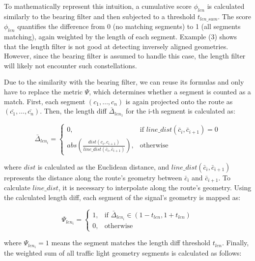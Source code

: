 To mathematically represent this intuition, a cumulative score $\phi_{len}$ is calculated similarly to the bearing filter and then subjected to a threshold $t_{len\_sum}$. The score $\phi_{len}$ quantifies the difference from 0 (no matching segments) to 1 (all segments matching), again weighted by the length of each segment. Example (3) shows that the length filter is not good at detecting inversely aligned geometries. However, since the bearing filter is assumed to handle this case, the length filter will likely not encounter such constellations.

Due to the similarity with the bearing filter, we can reuse its formulas and only have to replace the metric $\Psi$, which determines whether a segment is counted as a match. First, each segment $(c_1, \dots, c_n)$ is again projected onto the route as $(\bar{c_1}, \dots, \bar{c_n})$. Then, the length diff $\bar{\Delta}_{len_1}$ for the i-th segment is calculated as:

\begin{equation}
    \bar{\Delta}_{len_i} = 
        \begin{cases}
            0,& \text{if } line\_dist(\bar{c}_i, \bar{c}_{i+1}) = 0 \\
            abs(\frac{dist(c_{i}, c_{i+1})}{line\_dist(\bar{c}_{i}, \bar{c}_{i+1})}),              & \text{otherwise}
        \end{cases}
\end{equation}

where $dist$ is calculated as the Euclidean distance, and $line\_dist(\bar{c}_i, \bar{c}_{i+1})$ represents the distance along the route's geometry between $\bar{c}_i$ and $\bar{c}_{i+1}$. To calculate $line\_dist$, it is necessary to interpolate along the route's geometry. Using the calculated length diff, each segment of the signal's geometry is mapped as:

\begin{equation}
\Psi_{len_i} = 
    \begin{cases}
            1,& \text{if } \bar{\Delta}_{len_{i}} \in \left(1 - t_{len}, 1 + t_{len}\right)\\
            0,              & \text{otherwise}
        \end{cases}
\end{equation}

where $\Psi_{len_i} = 1$ means the segment matches the length diff threshold $t_{len}$. Finally, the weighted sum of all traffic light geometry segments is calculated as follows:

